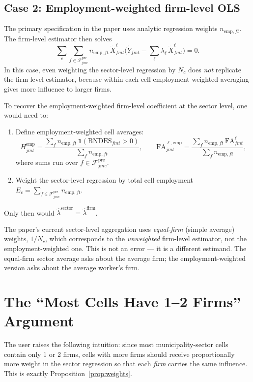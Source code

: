 \documentclass{article}
\newcommand{\FA}{\mathrm{FA}}
\newcommand{\ind}{\mathbf{1}}
\newcommand{\cFpre}{\mathcal{F}^{\mathrm{pre}}}
\theoremstyle{plain}
\begin{document}
\subsection{Case 2: Employment-weighted firm-level OLS}

The primary specification in the paper uses analytic regression weights
$n_{\mathrm{emp},ft}$.  The firm-level estimator then solves
\[
  \sum_c \sum_{f\in\cFpre_{jme}} n_{\mathrm{emp},ft}\,
  \tilde{X}^\ell_{fmt}\bigl(\tilde{Y}_{fmt}
  - \sum_\ell \lambda_\ell\,\tilde{X}^\ell_{fmt}\bigr) = 0.
\]
In this case, even weighting the sector-level regression by $N_c$ does
\emph{not} replicate the firm-level estimator, because within each cell
employment-weighted averaging gives more influence to larger firms.

To recover the employment-weighted firm-level coefficient at the sector level,
one would need to:
\begin{enumerate}
  \item Define employment-weighted cell averages:
    \[
      H^\mathrm{emp}_{jmt}
      = \frac{\sum_f n_{\mathrm{emp},ft}\,\ind(\text{BNDES}_{fmt}>0)}
             {\sum_f n_{\mathrm{emp},ft}},
      \qquad
      \overline{\FA}^{\ell,\mathrm{emp}}_{jmt}
      = \frac{\sum_f n_{\mathrm{emp},ft}\,\FA^\ell_{fmt}}
             {\sum_f n_{\mathrm{emp},ft}},
    \]
    where sums run over $f\in\cFpre_{jme}$.
  \item Weight the sector-level regression by total cell employment
    $E_c = \sum_{f\in\cFpre_{jme}} n_{\mathrm{emp},ft}$.
\end{enumerate}
Only then would $\hat\lambda^\mathrm{sector} = \hat\lambda^\mathrm{firm}$.

The paper's current sector-level aggregation uses \emph{equal-firm} (simple
average) weights, $1/N_c$, which corresponds to the \emph{unweighted}
firm-level estimator, not the employment-weighted one.  This is not an error
--- it is a different estimand.  The equal-firm sector average asks about the
average firm; the employment-weighted version asks about the average worker's
firm.

\section{The ``Most Cells Have 1--2 Firms'' Argument}

The user raises the following intuition: since most municipality-sector cells
contain only 1 or 2 firms, cells with more firms should receive proportionally
more weight in the sector regression so that each \emph{firm} carries the same
influence.  This is exactly Proposition~\ref{prop:weights}.
\end{document}
